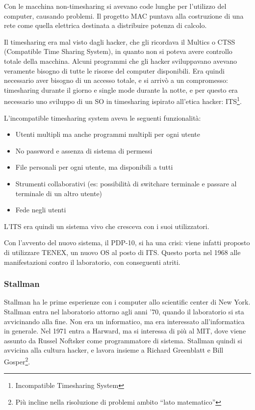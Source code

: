 Con le macchina non-timesharing si avevano code lunghe per l'utilizzo del computer, causando problemi. Il progetto MAC puntava alla costruzione di una rete come quella elettrica destinata a distribuire potenza di calcolo.

Il timesharing era mal visto dagli hacker, che gli ricordava il Multics o CTSS (Compatible Time Sharing System), in quanto non si poteva avere controllo totale della macchina. Alcuni programmi che gli hacker sviluppavano avevano veramente bisogno di tutte le risorse del computer disponibili. Era quindi necessario aver bisogno di un accesso totale, e si arriv\`o a un compromesso: timesharing durante il giorno e single mode durante la notte, e per questo era necessario uno sviluppo di un SO in timesharing ispirato all'etica hacker: ITS\footnote{Incompatible Timesharing System}.

L'incompatible timesharing system aveva le seguenti funzionalit\`a:
\begin{itemize}

\item Utenti multipli ma anche programmi multipli per ogni utente
\item No password e assenza di sistema di permessi
\item File personali per ogni utente, ma disponibili a tutti
\item Strumenti collaborativi (es: possibilit\`a di switchare terminale e passare al terminale di un altro utente)
\item Fede negli utenti

\end{itemize}

L'ITS era quindi un sistema vivo che cresceva  con i suoi utilizzatori.

Con l'avvento del nuovo sistema, il PDP-10, si ha una crisi: viene infatti proposto di utilizzare TENEX, un nuovo OS al posto di ITS. Questo porta nel 1968 alle manifestazioni contro il laboratorio, con conseguenti atriti.

\subsubsection{Stallman}

Stallman ha le prime esperienze con i computer allo scientific center di New York. Stallman entra nel laboratorio attorno agli anni '70, quando il laboratorio si sta avvicinando alla fine. Non era un informatico, ma era interessato all'informatica in generale. Nel 1971 entra a Harward, ma si interessa di pi\`u al MIT, dove viene assunto da Russel Noftsker come programmatore di sistema. Stallman quindi si avvicina alla cultura hacker, e lavora insieme a Richard Greenblatt e Bill Gosper\footnote{Pi\`u incline nella risoluzione di problemi ambito ``lato matematico''}.

